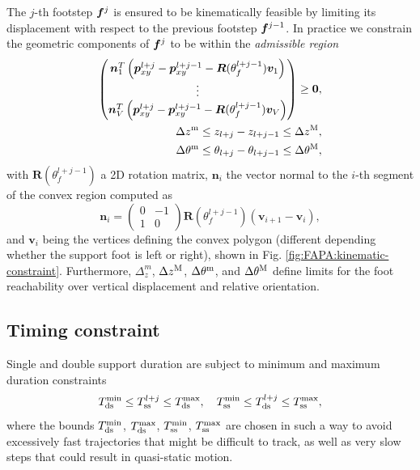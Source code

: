 The $j$-th footstep ${\bm{f}}^{j}$ is ensured to be kinematically feasible by
limiting its displacement with respect to the previous footstep ${\bm{f}}^{j-1}$.
In practice we constrain the geometric components of ${\bm{f}}^{j}$ to be within
the \textit{admissible region}
\begin{equation}
\label{eq:FAPA:kinematic-constraint}
\begin{split}
\begin{pmatrix}
    \bm{n}_1^T\left(\bm{p}_{xy}^{l+j} - \bm{p}_{xy}^{l+j-1} - \bm{R}(\theta_f^{l+j-1})\bm{v}_1\right) \\
    \vdots \\
    \bm{n}_V^T\left(\bm{p}_{xy}^{l+j} - \bm{p}_{xy}^{l+j-1} - \bm{R}(\theta_f^{l+j-1})\bm{v}_V\right) \\
\end{pmatrix} \ge \bm{0},\\
    \Delta z^{\rm m} \le z_{l+j} - z_{l+j-1} \le \Delta z^{\rm M}, \\
    \Delta \theta^{\rm m} \le \theta_{l+j} - \theta_{l+j-1} \le \Delta \theta^{\rm M}, 
\end{split}
\end{equation}
with $\bm{R}(\theta_f^{l+j-1})$ a 2D rotation matrix, $\bm{n}_i$ the vector
normal to the $i$-th segment of the convex region computed as
\begin{equation*}
    \bm{n}_i =
    \begin{pmatrix}
        0 & -1 \\ 1 & 0
    \end{pmatrix}
    \bm{R}(\theta_f^{l+j-1})(\bm{v}_{i+1}-\bm{v}_i),
\end{equation*}
and $\bm{v}_i$ being the vertices defining the convex polygon (different
depending whether the support foot is left or right), shown in
Fig. \ref{fig:FAPA:kinematic-constraint}. Furthermore,
$\Delta_z^m$, $\Delta z^{\rm M}$, $\Delta \theta^{\rm m}$, and
$\Delta \theta^{\rm M}$ define limits for the foot reachability over vertical
displacement and relative orientation.

\subsection{Timing constraint}
Single and double support duration are subject to minimum and maximum duration
constraints
\begin{equation}
    T_{\rm ds}^{\min} \le T_{\rm ss}^{l+j} \le T_{\rm ds}^{\max}, \quad T_{\rm ss}^{\min} \le T_{\rm ds}^{l+j} \le T_{\rm ss}^{\max},
    \label{eq:FAPA:timing-constraint}
\end{equation}
where the bounds $T_{\rm ds}^{\min}$, $T_{\rm ds}^{\max}$, $T_{\rm ss}^{\min}$, $T_{\rm ss}^{\max}$ are chosen in such a way to avoid excessively fast trajectories that might be difficult to track, as well as very slow steps that could result in quasi-static motion.

